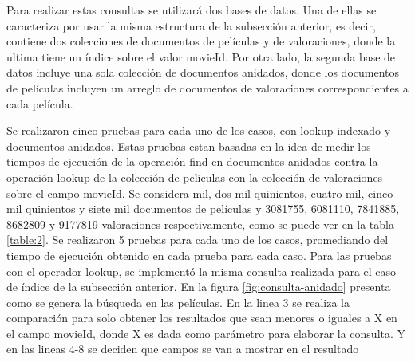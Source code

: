 \documentclass[conference,compsoc]{sty/IEEEtran}
\begin{document}

Para realizar estas consultas se utilizará dos bases de datos. Una de ellas se caracteriza por usar la misma estructura de la subsección anterior, es decir, contiene dos colecciones de documentos de películas y de valoraciones, donde la ultima tiene un índice sobre el valor movieId. Por otra lado, la segunda base de datos incluye una sola colección de documentos anidados, donde los documentos de películas incluyen un arreglo de documentos de valoraciones correspondientes a cada película.  %

Se realizaron cinco pruebas para cada uno de los casos, con lookup indexado y documentos anidados. Estas pruebas estan basadas en la idea de medir los tiempos de ejecución de la operación find en documentos anidados contra la operación lookup de la colección de películas con la colección de valoraciones sobre el campo movieId. Se considera mil, dos mil quinientos, cuatro mil, cinco mil quinientos y siete mil documentos de películas y 3081755, 6081110, 7841885, 8682809 y 9177819 valoraciones respectivamente, como se puede ver en la tabla \ref{table:2}. Se realizaron 5 pruebas para cada uno de los casos, promediando del tiempo de ejecución obtenido en cada prueba para cada caso. Para las pruebas con el operador lookup, se implementó la misma consulta realizada para el caso de índice de la subsección anterior. En la figura \ref{fig:consulta-anidado} presenta como se genera la búsqueda en las películas. En la linea 3 se realiza la comparación para solo obtener los resultados que sean menores o iguales a X en el campo movieId, donde X es dada como parámetro para elaborar la consulta. Y en las lineas 4-8 se deciden que campos se van a mostrar en el resultado
\end{document}
